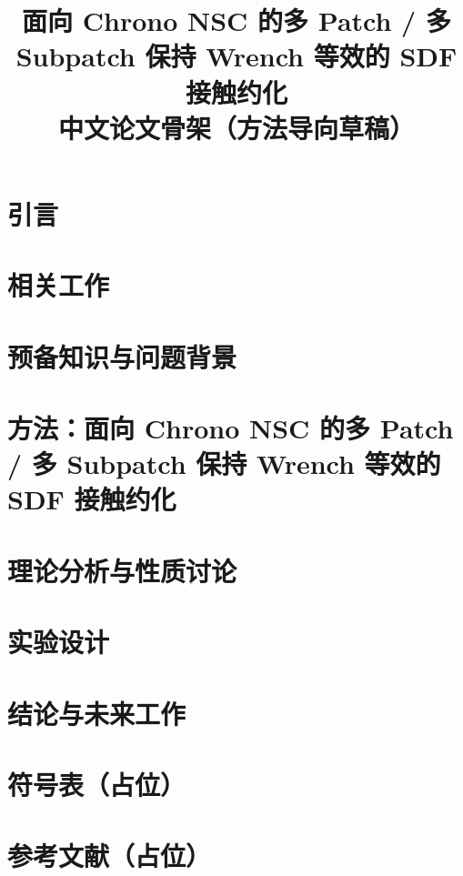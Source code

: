 \documentclass[UTF8,a4paper,11pt]{ctexart}
\title{面向 Chrono NSC 的多 Patch / 多 Subpatch 保持 Wrench 等效的 SDF 接触约化\\中文论文骨架（方法导向草稿）}
\author{}
\date{}
\begin{document}
\maketitle

\begin{abstract}

\end{abstract}



\section{引言}


\section{相关工作}


\section{预备知识与问题背景}


\section{方法：面向 Chrono NSC 的多 Patch / 多 Subpatch 保持 Wrench 等效的 SDF 接触约化}


\section{理论分析与性质讨论}


\section{实验设计}


\section{结论与未来工作}


\appendix
\section{符号表（占位）}


\section*{参考文献（占位）}

\end{document}
